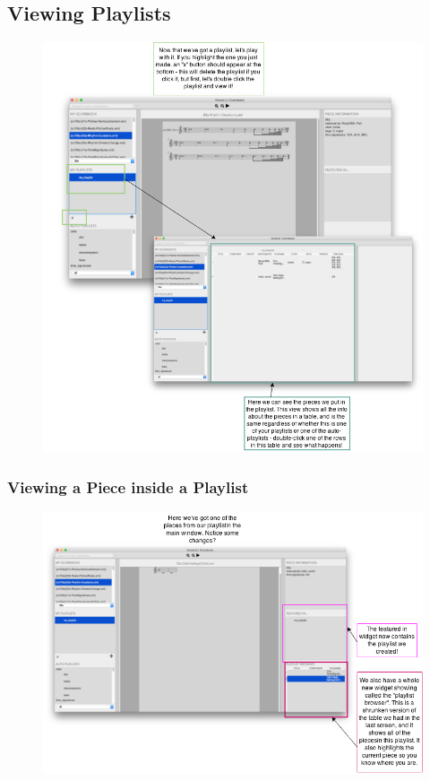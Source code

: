 \subsection{Viewing Playlists}
\begin{figure}[H]
\centering
\includegraphics[width=500pt]{view-playlist}	
\end{figure}
\subsubsection{Viewing a Piece inside a Playlist}
\begin{figure}[H]
\centering
\includegraphics[width=500pt]{view-piece-playlist}	
\end{figure}
